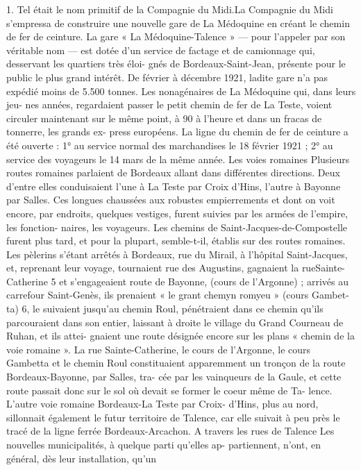 \documentclass[a4paper,11pt]{book}
\begin{document}
1. Tel était le nom primitif de la Compagnie du Midi.La Compagnie du Midi s'empressa de construire une
nouvelle gare de La Médoquine en créant le chemin de fer
de ceinture.
La gare « La Médoquine-Talence
» — pour l'appeler
par son véritable nom — est dotée d'un service de factage
et de camionnage qui, desservant les quartiers très éloi-
gnés de Bordeaux-Saint-Jean, présente pour le public le
plus grand intérêt.
De février à décembre 1921, ladite gare n'a pas expédié
moins de 5.500 tonnes.
Les nonagénaires de La Médoquine qui, dans leurs jeu-
nes années, regardaient passer le petit chemin de fer de
La Teste, voient circuler maintenant
sur le même point, à
90 à l'heure et dans
un fracas de tonnerre, les grands ex-
press européens.
La ligne du chemin de fer de ceinture a été ouverte :
1° au service normal des marchandises le 18 février 1921
;
2° au service des
voyageurs le 14 mars de la même année.
Les voies romaines
Plusieurs routes romaines parlaient de Bordeaux allant
dans différentes directions. Deux d'entre elles conduisaient
l'une à La Teste
par Croix d'Hins, l'autre à Bayonne par
Salles. Ces longues chaussées aux robustes empierrements
et dont on voit encore, par endroits, quelques vestiges,
furent suivies
par les armées de l'empire, les fonction-
naires, les voyageurs.
Les chemins de Saint-Jacques-de-Compostelle furent
plus tard, et pour la plupart, semble-t-il, établis
sur des
routes romaines. Les pèlerins s'étant arrêtés à Bordeaux,
rue du Mirail, à l'hôpital Saint-Jacques, et, reprenant leur
voyage, tournaient rue des Augustins, gagnaient la rueSainte-Catherine 5 et s'engageaient route de Bayonne,
(cours de l'Argonne) ; arrivés au carrefour Saint-Genès,
ils prenaient « le grant chemyn romyeu » (cours Gambet-
ta) 6, le suivaient jusqu'au chemin Roul, pénétraient dans
ce chemin qu'ils parcouraient dans son entier, laissant à
droite le village du Grand Courneau de Ruhan, et ils attei-
gnaient une route désignée encore sur les plans « chemin
de la voie romaine ».
La rue Sainte-Catherine, le cours de l'Argonne, le cours
Gambetta et le chemin Roul constituaient apparemment
un tronçon de la route Bordeaux-Bayonne, par Salles, tra-
cée par les vainqueurs de la Gaule, et cette route passait
donc sur le sol où devait se former le coeur même de Ta-
lence.
L'autre voie romaine Bordeaux-La Teste par Croix-
d'Hins, plus au nord, sillonnait également le futur territoire
de Talence, car elle suivait à peu près le tracé de la ligne
ferrée Bordeaux-Arcachon.
A travers les rues de Talence
Les nouvelles municipalités, à quelque parti qu'elles ap-
partiennent, n'ont, en général, dès leur installation, qu'un
\end{document}
